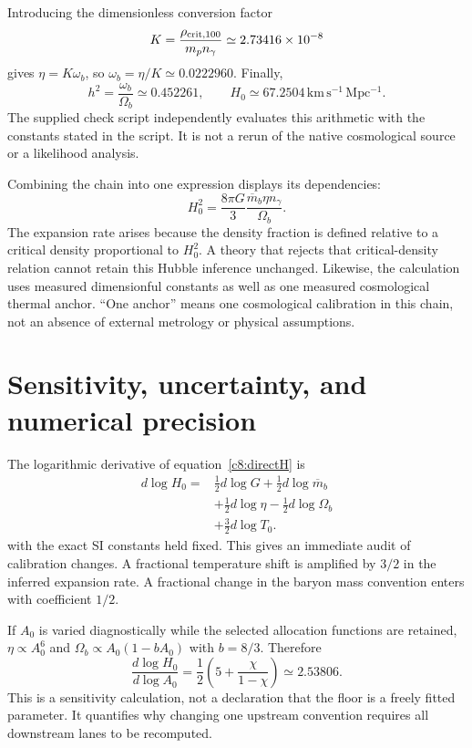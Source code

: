 Introducing the dimensionless conversion factor
\begin{equation}
 K=\frac{\rho_{\rm crit,100}}{m_pn_\gamma}
 \simeq2.73416\times10^{-8}
 \label{c8:K}
\end{equation}
gives $\eta=K\omega_b$, so $\omega_b=\eta/K\simeq0.0222960$. Finally,
\begin{equation}
 h^2=\frac{\omega_b}{\Omega_b}\simeq0.452261,
 \qquad H_0\simeq67.2504\,\mathrm{km\,s^{-1}\,Mpc^{-1}}.
 \label{c8:hubble}
\end{equation}
The supplied check script independently evaluates this arithmetic with the constants stated in the script. It is not a rerun of the native cosmological source or a likelihood analysis.

Combining the chain into one expression displays its dependencies:
\begin{equation}
 H_0^2=\frac{8\pi G}{3}
 \frac{\overline m_b\eta n_\gamma}{\Omega_b}.
 \label{c8:directH}
\end{equation}
The expansion rate arises because the density fraction is defined relative to a critical density proportional to $H_0^2$. A theory that rejects that critical-density relation cannot retain this Hubble inference unchanged. Likewise, the calculation uses measured dimensionful constants as well as one measured cosmological thermal anchor. ``One anchor'' means one cosmological calibration in this chain, not an absence of external metrology or physical assumptions.

\section{Sensitivity, uncertainty, and numerical precision}
The logarithmic derivative of equation~\eqref{c8:directH} is
\begin{equation}
 \begin{aligned}
 d\log H_0={}&\tfrac12d\log G+\tfrac12d\log\overline m_b\\
 &+\tfrac12d\log\eta-\tfrac12d\log\Omega_b\\
 &+\tfrac32d\log T_0.
 \end{aligned}
 \label{c8:sensitivity}
\end{equation}
with the exact SI constants held fixed. This gives an immediate audit of calibration changes. A fractional temperature shift is amplified by $3/2$ in the inferred expansion rate. A fractional change in the baryon mass convention enters with coefficient $1/2$.

If $A_0$ is varied diagnostically while the selected allocation functions are retained, $\eta\propto A_0^6$ and $\Omega_b\propto A_0(1-bA_0)$ with $b=8/3$. Therefore
\begin{equation}
 \frac{d\log H_0}{d\log A_0}
 =\frac12\left(5+\frac{\chi}{1-\chi}\right)
 \simeq2.53806.
 \label{c8:floorresponse}
\end{equation}
This is a sensitivity calculation, not a declaration that the floor is a freely fitted parameter. It quantifies why changing one upstream convention requires all downstream lanes to be recomputed.

